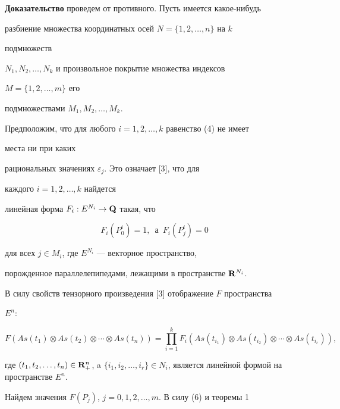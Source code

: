  


{\bf Доказательство} проведем от противного. Пусть имеется какое-нибудь  


разбиение множества координатных осей $N=\{1,2,\dotsc,n\}$ на $k$ 


подмножеств 


$N_1,N_2,\dotsc,N_k$ и произвольное покрытие множества индексов 


$M=\{1,2,\dotsc,m\}$ его  


подмножествами $M_1,M_2,\dotsc,M_k$. 


Предположим, что для любого $i=1,2,\dotsc,k$ равенство (4) не имеет 


места ни при каких  


рациональных значениях $\varepsilon_j$. Это означает [3], что для 


каждого $i=1,2,\dotsc,k$ найдется  


линейная форма $F_i:E^{N_i}\to\bold Q$ такая, что 


\begin{equation} 


F_i(P^i_0)=1,\ \; 


\text{а}\ \; F_i(P^i_j)=0 


\end{equation} 


для всех $j\in M_i$, где $E^{N_i}$ --- векторное пространство,  


порожденное параллелепипедами, лежащими в пространстве $\bold R^{N_i}$. 


 


В силу свойств тензорного произведения [3] отображение $F$ пространства 


$E^n$: 


\begin{equation} 


F(As(t_1)\otimes As(t_2)\otimes\dotsb\otimes As(t_n))= 


\prod^k_{i=1}F_i(As(t_{i_1})\otimes As(t_{i_2}) 


\otimes\dotsb\otimes As(t_{i_r})), 


\end{equation}  


где $(t_1,t_2,\dotsc,t_n)\in\bold R^n_+$, a $\{i_1,i_2,\dotsc,i_r\}\in 


N_i$, является линейной формой на пространстве $E^n$. 


 


Найдем значения $F(P_j)$, $j=0,1,2,\dotsc,m$. В силу (6) и теоремы 1 


